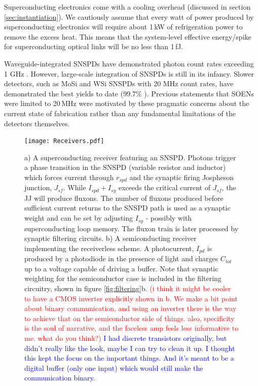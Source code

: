 \documentclass[twocolumn]{article}
\begin{document}
Superconducting electronics come with a cooling overhead (discussed in section \ref{sec:instantiation}). We cautiously assume that every watt of power produced by superconducting electronics will require about 1\,kW of refrigeration power to remove the excess heat. This means that the system-level effective energy/spike for superconducting optical links will be no less than 1\,fJ.

Waveguide-integrated SNSPDs have demonstrated photon count rates exceeding 1 GHz \cite{vetter2016cavity}. However, large-scale integration of SNSPDs is still in its infancy. Slower detectors, such as MoSi and WSi SNSPDs with 20 MHz count rates, have demonstrated the best yields to date (99.7\% \cite{wove2019} ). Previous statements that SOENs were limited to 20\,MHz were motivated by these pragmatic concerns about the current state of fabrication rather than any fundamental limitations of the detectors themselves.

\begin{figure}
    \centering
    \texttt{[image: Receivers.pdf]}
    \caption{a) A superconducting receiver featuring an SNSPD. Photons trigger a phase transition in the SNSPD (variable resistor and inductor) which forces current through $r_{spd}$ and the synaptic firing Jospheson junction, $J_{sf}$. While $I_{spd} + I_{sy}$ exceeds the critical current of $J_{sf}$, the JJ will produce fluxons. The number of fluxons produced before sufficient current returns to the SNSPD path is used as a synaptic weight and can be set by adjusting $I_{sy}$ - possibly with superconducting loop memory. The fluxon train is later processed by synaptic filtering circuits. b) A semiconducting receiver implementing the receiverless scheme. A photocurrent, $I_{pd}$ is produced by a photodiode in the presence of light and charges $C_{tot}$ up to a voltage capable of driving a buffer. Note that synaptic weighting for the semiconductor case is included in the filtering circuitry, shown in figure \ref{fig:filtering}b. \textcolor{red}{(i think it might be cooler to have a CMOS inverter explicitly shown in b. We make a bit point about binary communication, and using an inverter there is the way to achieve that on the semiconductor side of things. also, specificity is the soul of narrative, and the faceless amp feels less informative to me. what do you think?)} \textcolor{blue}{I had discrete transistors originally, but didn't really like the look, maybe I can try to clean it up. I thought this kept the focus on the important things. And it's meant to be a digital buffer (only one input) which would still make the communication binary.}}
    \label{fig:sup_synapse}
\end{figure}
\end{document}
